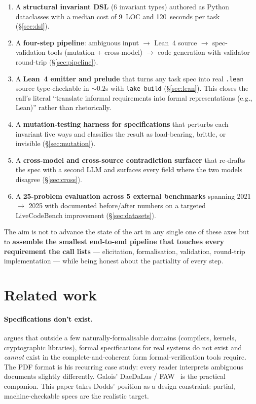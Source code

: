 \documentclass{article}
\begin{document}
\begin{enumerate}
\item A \textbf{structural invariant DSL} (6 invariant types) authored as Python dataclasses with a median cost of 9~LOC and 120~seconds per task (\S\ref{sec:dsl}).
\item A \textbf{four-step pipeline}: ambiguous input $\to$ Lean~4 source $\to$ spec-validation tools (mutation + cross-model) $\to$ code generation with validator round-trip (\S\ref{sec:pipeline}).
\item A \textbf{Lean~4 emitter and prelude} that turns any task spec into real \texttt{.lean} source type-checkable in $\sim 0.2$s with \texttt{lake build} (\S\ref{sec:lean}). This closes the call's literal ``translate informal requirements into formal representations (e.g., Lean)'' rather than rhetorically.
\item A \textbf{mutation-testing harness for specifications} that perturbs each invariant five ways and classifies the result as load-bearing, brittle, or invisible (\S\ref{sec:mutation}).
\item A \textbf{cross-model and cross-source contradiction surfacer} that re-drafts the spec with a second LLM and surfaces every field where the two models disagree (\S\ref{sec:cross}).
\item A \textbf{25-problem evaluation across 5 external benchmarks} spanning 2021 $\to$ 2025 with documented before/after numbers on a targeted LiveCodeBench improvement (\S\ref{sec:datasets}).
\end{enumerate}

The aim is not to advance the state of the art in any single one of these axes but to \textbf{assemble the smallest end-to-end pipeline that touches every requirement the call lists} --- elicitation, formalisation, validation, round-trip implementation --- while being honest about the partiality of every step.

\section{Related work}

\paragraph{Specifications don't exist.}
\citet{dodds2025} argues that outside a few naturally-formalisable domains (compilers, kernels, cryptographic libraries), formal specifications for real systems do not exist and \emph{cannot} exist in the complete-and-coherent form formal-verification tools require. The PDF format is his recurring case study: every reader interprets ambiguous documents slightly differently. Galois' DaeDaLus / FAW~\cite{daedalus2024} is the practical companion. This paper takes Dodds' position as a design constraint: partial, machine-checkable specs are the realistic target.
\end{document}
